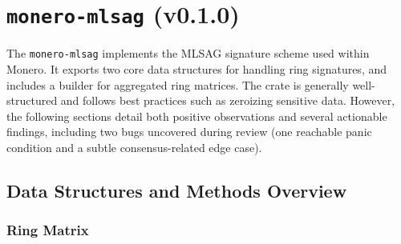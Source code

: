 \documentclass[12pt,a4paper]{article}
\begin{document}




\section{\texttt{monero-mlsag} (v0.1.0)}
The \texttt{monero-mlsag} implements the MLSAG signature scheme used within Monero. It exports two core data
structures for handling ring signatures, and includes a builder for aggregated ring matrices. The
crate is generally well-structured and follows best practices such as zeroizing sensitive data. However,
the following sections detail both positive observations and several actionable findings, including
two bugs uncovered during review (one reachable panic condition and a subtle consensus-related edge case).

\subsection{Data Structures and Methods Overview}

\subsubsection{Ring Matrix}
\label{subsubsec:ring-matrix}
\end{document}
